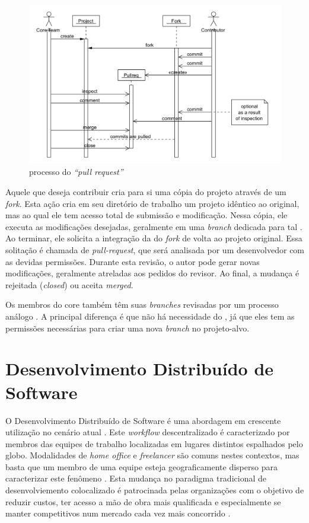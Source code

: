 \documentclass[12pt,openany,oneside,a4paper,english,brazil]{abntbibufjf}
\begin{document}
     \begin{figure}[!htbp]
      \includegraphics[width=\textwidth]{pull-request-flow}
      \caption{processo do \textit{``pull request''} \cite{gousios2014}}\label{fig:pull-request-flow}
    \end{figure}

    Aquele que deseja contribuir cria para si uma cópia do projeto através de um \textit{fork}. Esta ação cria em seu diretório de trabalho um projeto idêntico ao original, mas ao qual ele tem acesso total de submissão e modificação. Nessa cópia, ele executa as modificações desejadas, geralmente em uma \textit{branch} dedicada para tal \cite{gousios2016}. Ao terminar, ele solicita a integração da  do \textit{fork} de volta ao projeto original. Essa solitação é chamada de \textit{pull-request}, que será analisada por um desenvolvedor com as devidas permissões. Durante esta revisão, o autor pode gerar novas modificações, geralmente atreladas aos pedidos do revisor. Ao final, a mudança é rejeitada (\textit{closed}) ou aceita \textit{merged}.

    Os membros do core também têm suas \textit{branches} revisadas por um processo análogo \cite{6385140,Bosu2014}. A principal diferença é que não há necessidade do , já que eles tem as permissões necessárias para criar uma nova \textit{branch} no projeto-alvo.

  \section{Desenvolvimento Distribuído de Software}\label{sec:dds}

  O Desenvolvimento Distribuído de Software é uma abordagem em crescente utilização no cenário atual \cite{mens2019}. Este \textit{workflow} descentralizado é caracterizado por membros das equipes de trabalho localizadas em lugares distintos espalhados pelo globo. Modalidades de \textit{home office} e \textit{freelancer} são comuns nestes contextos, mas basta que um membro de uma equipe esteja geograficamente disperso para caracterizar este fenômeno \cite{stadler2019}.  Esta mudança no paradigma tradicional de desenvolviemento colocalizado é patrocinada pelas organizações com o objetivo de reduzir custos, ter acesso a mão de obra mais qualificada e especialmente se manter competitivos num mercado cada vez mais concorrido \cite{herbsleb2001}.
\end{document}
